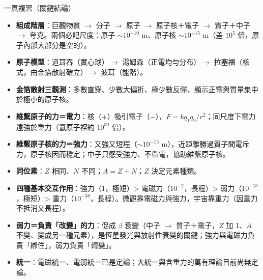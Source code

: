 \documentclass[11pt]{article}
\begin{document}
\begin{補充框}{一頁複習（關鍵結論）}
\begin{itemize}\setlength{\itemsep}{2pt}
\item \textbf{組成階層}：巨觀物質 $\rightarrow$ 分子 $\rightarrow$ 原子 $\rightarrow$ 原子核＋電子 $\rightarrow$ 質子＋中子 $\rightarrow$ 夸克。兩個必記尺度：原子 $\sim10^{-10}$ m、原子核 $\sim10^{-15}$ m（差 $10^5$ 倍，原子內部大部分是空的）。
\item \textbf{原子模型}：道耳吞（實心球）$\rightarrow$ 湯姆森（正電均勻分布）$\rightarrow$ 拉塞福（核式，由金箔散射確立）$\rightarrow$ 波耳（能階）。
\item \textbf{金箔散射三觀測}：多數直穿、少數大偏折、極少數反彈，顯示正電與質量集中於極小的原子核。
\item \textbf{維繫原子的力＝電力}：核（$+$）吸引電子（$-$），$F=kq_1q_2/r^2$；同尺度下電力遠強於重力（氫原子裡約 $10^{39}$ 倍）。
\item \textbf{維繫原子核的力＝強力}：又強又短程（$\sim10^{-15}$ m），近距離勝過質子間電斥力，原子核因而穩定；中子只感受強力、不帶電，協助維繫原子核。
\item \textbf{同位素}：$Z$ 相同、$N$ 不同；$A=Z+N$；$Z$ 決定元素種類。
\item \textbf{四種基本交互作用}：強力（$1$，極短）> 電磁力（$10^{-2}$，長程）> 弱力（$10^{-13}$，極短）> 重力（$10^{-38}$，長程）。微觀靠電磁力與強力，宇宙靠重力（因重力不抵消又長程）。
\item \textbf{弱力＝負責「改變」的力}：促成 $\beta$ 衰變（中子 $\rightarrow$ 質子＋電子，$Z$ 加 1、$A$ 不變、變成另一種元素），是恆星發光與放射性衰變的關鍵；強力與電磁力負責「綁住」，弱力負責「轉變」。
\item \textbf{統一}：電磁統一、電弱統一已是定論；大統一與含重力的萬有理論目前尚無定論。
\end{itemize}
\end{補充框}
\end{document}

